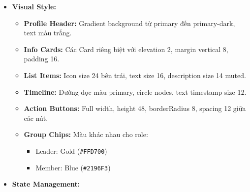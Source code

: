 \begin{itemize}
\begin{itemize}
            \item \textbf{Toggle Status:} Nhấn nút khóa/mở khóa hiển thị \texttt{Dialog} xác nhận với lý do (TextInput multiline).
            \item \textbf{Send Notification:} Nhấn nút gửi thông báo mở \texttt{Dialog} nhập tiêu đề và nội dung thông báo.
            \item \textbf{Delete Action:} Nhấn nút xóa hiển thị \texttt{Dialog} với cảnh báo nghiêm trọng và yêu cầu nhập mật khẩu admin xác nhận.
            \item \textbf{Menu Actions:} Menu phía trên phải với options:
                \begin{itemize}
                    \item ``Gửi email reset mật khẩu''
                    \item ``Xem log hoạt động''
                    \item ``Export dữ liệu người dùng''
                \end{itemize}
        \end{itemize}
    \item \textbf{Visual Style:}
        \begin{itemize}
            \item \textbf{Profile Header:} Gradient background từ primary đến primary-dark, text màu trắng.
            \item \textbf{Info Cards:} Các Card riêng biệt với elevation 2, margin vertical 8, padding 16.
            \item \textbf{List Items:} Icon size 24 bên trái, text size 16, description size 14 muted.
            \item \textbf{Timeline:} Đường dọc màu primary, circle nodes, text timestamp size 12.
            \item \textbf{Action Buttons:} Full width, height 48, borderRadius 8, spacing 12 giữa các nút.
            \item \textbf{Group Chips:} Màu khác nhau cho role:
                \begin{itemize}
                    \item Leader: Gold (\texttt{\#FFD700})
                    \item Member: Blue (\texttt{\#2196F3})
                \end{itemize}
        \end{itemize}
    \item \textbf{State Management:}
        \begin{itemize}

\end{itemize}
\end{itemize}
